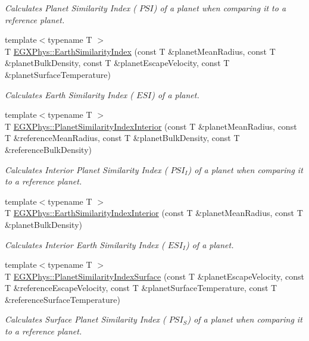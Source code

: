 \begin{DoxyCompactItemize}
\begin{DoxyCompactList}\small\item\em Calculates Planet Similarity Index ( $PSI$) of a planet when comparing it to a reference planet. \end{DoxyCompactList}\item 
{\footnotesize template$<$typename T $>$ }\\T \hyperlink{group___astrophysics_ga4b86397b1c839c49ac599d49fda207d4}{E\+G\+X\+Phys\+::\+Earth\+Similarity\+Index} (const T \&planet\+Mean\+Radius, const T \&planet\+Bulk\+Density, const T \&planet\+Escape\+Velocity, const T \&planet\+Surface\+Temperature)
\begin{DoxyCompactList}\small\item\em Calculates Earth Similarity Index ( $ESI$) of a planet. \end{DoxyCompactList}\item 
{\footnotesize template$<$typename T $>$ }\\T \hyperlink{group___astrophysics_ga6dc06a1a8baf6e132abed51fcf410c7f}{E\+G\+X\+Phys\+::\+Planet\+Similarity\+Index\+Interior} (const T \&planet\+Mean\+Radius, const T \&reference\+Mean\+Radius, const T \&planet\+Bulk\+Density, const T \&reference\+Bulk\+Density)
\begin{DoxyCompactList}\small\item\em Calculates Interior Planet Similarity Index ( $PSI_I$) of a planet when comparing it to a reference planet. \end{DoxyCompactList}\item 
{\footnotesize template$<$typename T $>$ }\\T \hyperlink{group___astrophysics_ga699bcc2f17b8855eaa856595d8032f61}{E\+G\+X\+Phys\+::\+Earth\+Similarity\+Index\+Interior} (const T \&planet\+Mean\+Radius, const T \&planet\+Bulk\+Density)
\begin{DoxyCompactList}\small\item\em Calculates Interior Earth Similarity Index ( $ESI_I$) of a planet. \end{DoxyCompactList}\item 
{\footnotesize template$<$typename T $>$ }\\T \hyperlink{group___astrophysics_gae0c7dce2779d66b0560ca388a34ddc39}{E\+G\+X\+Phys\+::\+Planet\+Similarity\+Index\+Surface} (const T \&planet\+Escape\+Velocity, const T \&reference\+Escape\+Velocity, const T \&planet\+Surface\+Temperature, const T \&reference\+Surface\+Temperature)
\begin{DoxyCompactList}\small\item\em Calculates Surface Planet Similarity Index ( $PSI_S$) of a planet when comparing it to a reference planet. \end{DoxyCompactList}\item 

\end{DoxyCompactItemize}
